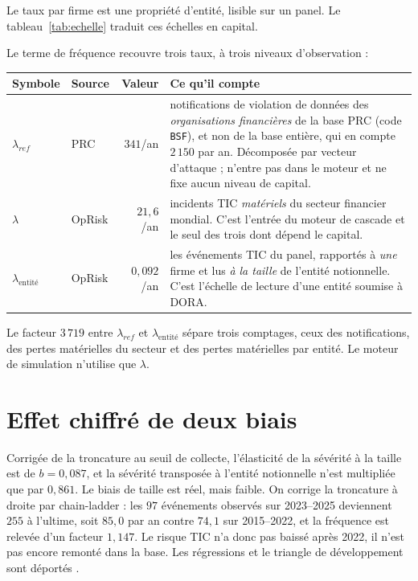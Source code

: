 Le taux par firme est une propriété d'entité, lisible sur un panel. Le tableau~\ref{tab:echelle} traduit ces échelles en capital.

Le terme de fréquence recouvre trois taux, à trois niveaux d'observation :
\begin{center}\small
\renewcommand{\arraystretch}{1.3}
\begin{tabular}{@{}l l r p{5.1cm}@{}}
\toprule
\textbf{Symbole} & \textbf{Source} & \textbf{Valeur} & \textbf{Ce qu'il compte} \\
\midrule
$\lambda_{ref}$ & PRC & $341$/an & notifications de violation de données des
\emph{organisations financières} de la base PRC (code \texttt{BSF}), et non de la base
entière, qui en compte $2\,150$ par an. Décomposée par vecteur d'attaque ; n'entre pas dans le moteur et ne fixe aucun niveau de capital. \\
$\lambda$ & OpRisk & $21{,}6$/an & incidents TIC \emph{matériels} du secteur
financier mondial. C'est l'entrée du moteur de cascade et le seul des trois dont dépend le capital. \\
$\lambda_{\text{entité}}$ & OpRisk & $0{,}092$/an & les événements TIC du panel, rapportés
à \emph{une} firme et lus \emph{à la taille} de l'entité notionnelle. C'est
l'échelle de lecture d'une entité soumise à DORA. \\
\bottomrule
\end{tabular}
\end{center}
Le facteur $3\,719$ entre $\lambda_{ref}$ et $\lambda_{\text{entité}}$ sépare trois comptages, ceux des notifications, des pertes
matérielles du secteur et des pertes matérielles par entité. Le moteur de simulation n'utilise que
$\lambda$.

\section{Effet chiffré de deux biais}
\label{sec:biais-chiffres}

Corrigée de la troncature au seuil de collecte, l'élasticité de la sévérité à la taille est de
$b=0{,}087$, et la sévérité transposée à l'entité notionnelle n'est multipliée que par $0{,}861$. Le
biais de taille est réel, mais faible. On corrige la troncature à droite par chain-ladder : les $97$ événements observés sur 2023--2025 deviennent $255$ à l'ultime, soit $85{,}0$ par an contre $74{,}1$ sur 2015--2022, et la fréquence est relevée d'un facteur $1{,}147$. Le risque TIC n'a donc pas
baissé après 2022, il n'est pas encore remonté dans la base. Les régressions et le triangle de
développement sont déportés \matcomp.

